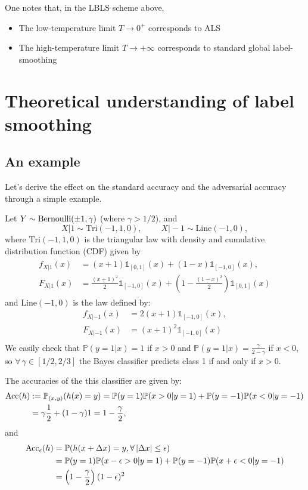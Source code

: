 One notes that, in the LBLS scheme above,
\begin{itemize}
\item The low-temperature limit $T \rightarrow 0^+$ corresponds to ALS
\item The high-temperature limit $T \rightarrow +\infty$ corresponds to standard
  global label-smoothing
\end{itemize}


\section{Theoretical understanding of label smoothing}
\subsection{An example}

Let's derive the effect on the standard accuracy and the adversarial accuracy
through a simple example.

Let $Y \sim \operatorname{Bernoulli}(\pm 1, \gamma)$ (where $\gamma > 1/2$), and
$$ X|1 \sim \text{Tri}(-1,1,0),\; \quad \quad X|-1 \sim \text{Line}(-1,0),$$
where $\text{Tri}(-1,1,0)$ is the triangular law with density
and cumulative distribution function (CDF) given by
\begin{eqnarray*}
  \begin{split}
    f_{X|1}(x) &= (x+1)\mathbb{1}_{[0,1]}(x) + (1-x)\mathbb{1}_{[-1,0]}(x), \\
    F_{X|1}(x) &= \frac{(x+1)^2}{2}\mathbb{1}_{[-1,0]}(x) + \left(1 -
    \frac{(1-x)^2}{2}\right)\mathbb{1}_{[0,1]}(x)
 \end{split}
\end{eqnarray*} 
and $\text{Line}(-1,0)$ is the law defined by:
\begin{align*}
f_{X|-1}(x) &= 2(x+1)\mathbb{1}_{[-1,0]}(x),\\
F_{X|-1}(x) &= (x+1)^2\mathbb{1}_{[-1,0]}(x) \\
\end{align*}
We easily check that $\mathbb{P}(y = 1 | x) = 1$ if $x > 0$ and
$\displaystyle{\mathbb{P}(y = 1 | x) = \frac{\gamma}{2-\gamma}}$ if $x < 0$, so
$\forall \, \gamma \in [1/2 , 2/3]$ the Bayes classifier predicts class 1 if and
only if $x > 0$.

The accuracies of the this classifier are given by:
\begin{align*}
  \operatorname{Acc}(h) &:= \mathbb{P}_{(x,y)}(h(x)=y) =\mathbb{P}(y=1)\mathbb{P}(x>0|y=1) + \mathbb{P}(y=-1)\mathbb{P}(x<0|y=-1) \\ &= \gamma \frac{1}{2} + (1-\gamma)1 = 1 - \frac{\gamma}{2},
\end{align*}
and
\begin{align*}
\operatorname{Acc}_\epsilon(h) &= \mathbb{P}(h(x+ \Delta x) = y, \forall \, |\Delta x| \leq \epsilon) \\
&= \mathbb{P}(y=1)\mathbb{P}(x - \epsilon > 0 | y=1) + \mathbb{P}(y=-1)\mathbb{P}(x + \epsilon < 0 | y=-1) \\
&= \left( 1 - \frac{\gamma}{2} \right) (1- \epsilon)^2
\end{align*}


